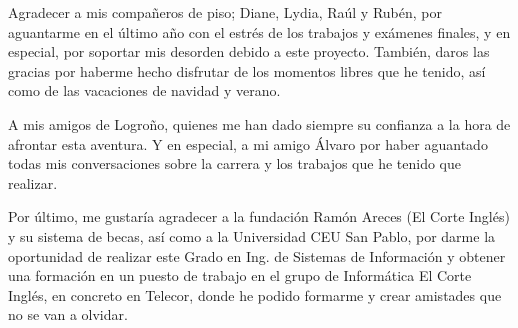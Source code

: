 \documentclass[a4paper,11pt,oneside]{report}
\begin{document}
Agradecer a mis compañeros de piso; Diane, Lydia, Raúl y Rubén, por aguantarme en el último año con el estrés de los trabajos y exámenes finales, y en especial, por soportar mis desorden debido a este proyecto. También, daros las gracias por haberme hecho disfrutar de los momentos libres que he tenido, así como de las vacaciones de navidad y verano.

A mis amigos de Logroño, quienes me han dado siempre su confianza a la hora de afrontar esta aventura. Y en especial, a mi amigo Álvaro por haber aguantado todas mis conversaciones sobre la carrera y los trabajos que he tenido que realizar.

Por último, me gustaría agradecer a la fundación Ramón Areces (El Corte Inglés) y su sistema de becas, así como a la Universidad CEU San Pablo, por darme la oportunidad de realizar este Grado en Ing. de Sistemas de Información y obtener una formación en un puesto de trabajo en el grupo de Informática El Corte Inglés, en concreto en Telecor, donde he podido formarme y crear amistades que no se van a olvidar.







\tableofcontents


\cleardoublepage
{} %
\listoffigures



















\nocite{*}

{}
\end{document}
